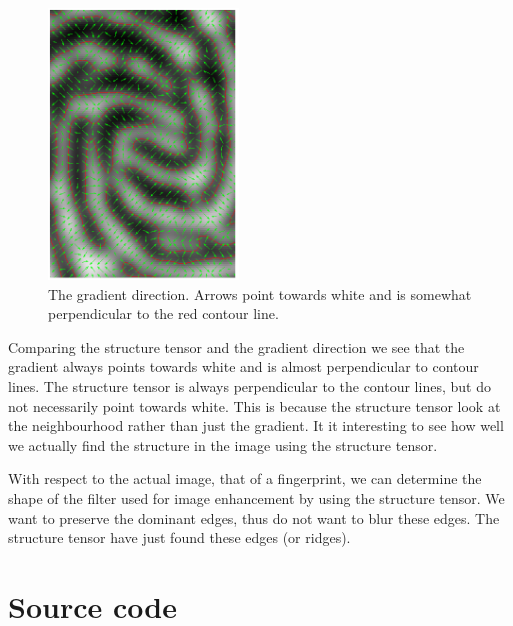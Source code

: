 \documentclass[a4paper, 10pt, final]{article}
\begin{document}
\begin{figure}[!h]
    \centering
    \includegraphics[angle=0,width=0.45\textwidth]{images/gradient_vector}
    \caption[]{The gradient direction. Arrows point towards white and is
    somewhat perpendicular to the red contour line.}
    \label{gradient_vector}
\end{figure}

Comparing the structure tensor and the gradient direction we see that
the gradient always points towards white and is almost perpendicular to
contour lines. The structure tensor is always perpendicular to the
contour lines, but do not necessarily point towards white. This is
because the structure tensor look at the neighbourhood rather than just
the gradient. It it interesting to see how well we actually find the
structure in the image using the structure tensor.

With respect to the actual image, that of a fingerprint, we can
determine the shape of the filter used for image enhancement by using
the structure tensor. We want to preserve the dominant edges, thus do
not want to blur these edges. The structure tensor have just found these
edges (or ridges).

\clearpage





\appendix
\lstset{language=Matlab, basicstyle=\scriptsize,
    showstringspaces=false, numbers=left, stepnumber=1,
    numberstyle=\tiny, frame=none}
\section{Source code}
\end{document}
